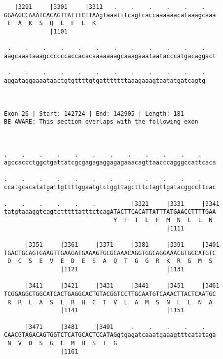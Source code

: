 \documentclass{article}
\begin{document}
\begin{Verbatim}
   |3291     |3301     |3311   .    .    .    .    .    .   
GGAAGCCAAATCACAGTTATTTCTTAAgtaaatttcagtcaccaaaaaacataaagcaaa
 E  A  K  S  Q  L  F  L  K                                  
             |1101                                          
  
 .    .    .    .    .    .    .    .    .    .    .    .   
aagcaaataaagccccccaccacacaaaaaaagcaaagaaataatacccatgacaggact
                                                            
 .    .    .    .    .    .    .    .    .    .    .    .
aggataggaaaataactgtgttttgtgatttttttaaagaaagtaatatgatcagtg
                                                         
                                                         
 
Exon 26 | Start: 142724 | End: 142905 | Length: 181
BE AWARE: This section overlaps with the following exon



.    .    .    .    .    .    .    .    .    .    .    .    
agccaccctggctgattatcgcgagagaggagagaaacagttaacccagggccattcaca
                                                            
.    .    .    .    .    .    .    .    .    .    .    .    
ccatgcacatatgattgttttggaatgtctggttagctttctagttgatacggccttcac
                                                            
.    .    .    .    .    .          |3321     |3331     |3341
tatgtaaaggtcagtctttttatttctcagATACTTCACATTATTTATGAACCTTTTGAA
                               Y  F  T  L  F  M  N  L  L  N 
                                              |1111         
  
      |3351     |3361     |3371     |3381     |3391     |3401
TGACTGCAGTGAAGTTGAAGATGAAAGTGCGCAAACAGGTGGCAGGAAACGTGGCATGTC
 D  C  S  E  V  E  D  E  S  A  Q  T  G  G  R  K  R  G  M  S 
                |1121                         |1131         
  
      |3411     |3421     |3431     |3441     |3451     |3461
TCGGAGGCTGGCATCACTGAGGCACTGTACGGTCCTTGCAATGTCAAACTTACTCAATGC
 R  R  L  A  S  L  R  H  C  T  V  L  A  M  S  N  L  L  N  A 
                |1141                         |1151         
  
      |3471     |3481     |3491     .    .    .    .    .   
CAACGTAGACAGTGGTCTCATGCACTCCATAGgtgagatcaaatgaaagtttcatataga
 N  V  D  S  G  L  M  H  S  I  G                            
                |1161                                       
  

\end{Verbatim}
\end{document}
